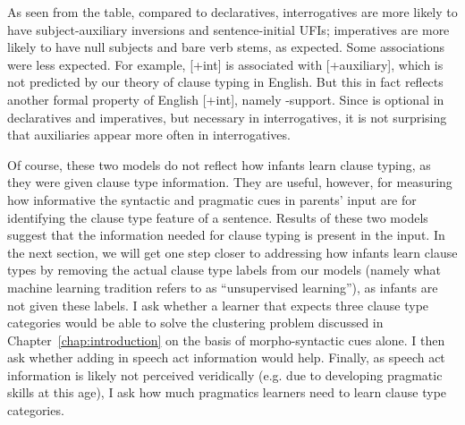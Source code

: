 As seen from the table, compared to declaratives, interrogatives are more likely to have subject-auxiliary inversions and sentence-initial UFIs; imperatives are more likely to have null subjects and bare verb stems, as expected. Some associations were less expected. For example, [+int] is associated with [+auxiliary], which is not predicted by our theory of clause typing in English. But this in fact reflects another formal property of English [+int], namely -support. Since  is optional in declaratives and imperatives, but necessary in interrogatives, it is not surprising that auxiliaries appear more often in interrogatives. 


Of course, these two models do not reflect how infants learn clause typing, as they were given clause type information. They are useful, however, for measuring how informative the syntactic and pragmatic cues in parents' input are for identifying the clause type feature of a sentence. Results of these two models suggest that the information needed for clause typing is present in the input. In the next section, we will get one step closer to addressing how infants learn clause types by removing the actual clause type labels from our models (namely what machine learning tradition refers to as ``unsupervised learning''), as infants are not given these labels. I ask whether a learner that expects three clause type categories would be able to solve the clustering problem discussed in Chapter~\ref{chap:introduction} on the basis of morpho-syntactic cues alone. I then ask whether adding in speech act information would help. Finally, as speech act information is likely not perceived veridically (e.g. due to developing pragmatic skills at this age), I ask how much pragmatics learners need to learn clause type categories. 

